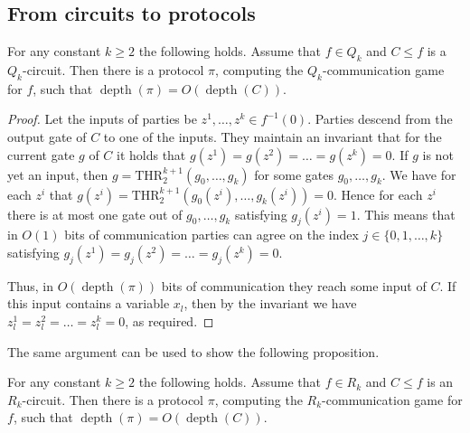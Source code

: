 \documentclass{toc}
\def\THR{\mathrm{THR}}
\DeclareMathOperator{\depth}{depth}  %
\begin{document}
\subsection{From circuits to protocols} \label{subsec:circ_to_prot}
\begin{proposition}
\label{Q_k_to_protocols}
For any constant $k\ge 2$ the following holds.
Assume that $f\in Q_k$ and $C\le f$ is a $Q_k$-circuit. Then there is a protocol $\pi$, computing the $Q_k$-communication game for $f$, such that $\depth(\pi) =  O(\depth(C))$.
\end{proposition}
\begin{proof}
Let the inputs of parties be $z^1, \ldots, z^k\in f^{-1}(0)$.
Parties descend from the output gate of $C$ to one of the inputs. They maintain an invariant that for the current gate $g$ of $C$ it holds that $g(z^1) = g(z^2) = \ldots = g(z^k) = 0$. If $g$ is not yet an input, then $g = \THR^{k + 1}_2(g_0, \ldots, g_{k})$ for some gates $g_0, \ldots, g_{k}$. We have for each $z^i$ that $g(z^i) =  \THR^{k + 1}_2(g_0(z^i), \ldots, g_{k}(z^i)) = 0$. Hence for each $z^i$ there is at most one gate out of $g_0, \ldots, g_{k}$ satisfying $g_j(z^i) = 1$. This means that in $O(1)$ bits of communication parties can agree on the index $j\in \{0, 1, \ldots, k\}$ satisfying $g_j(z^1) = g_j(z^2) = \ldots = g_j(z^k) = 0$. 

Thus, in $O(\depth(\pi))$ bits of communication they reach some input of $C$. If this input contains a variable $x_l$, then by the invariant we have $z^1_l = z^2_l = \ldots = z_l^k = 0$, as required.
\end{proof}

The same argument can be used to show the following proposition.
\begin{proposition}
\label{R_k_to_protocols}
For any constant $k\ge 2$ the following holds.
Assume that $f\in R_k$ and $C\le f$ is an $R_k$-circuit. Then there is a protocol $\pi$, computing the $R_k$-communication game for $f$, such that $\depth(\pi) =  O(\depth(C))$.
\end{proposition}
\end{document}
